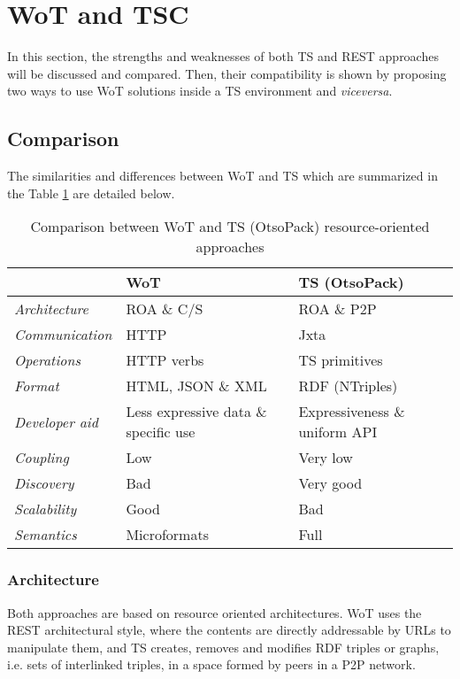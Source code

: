 \section{WoT and TSC}
\label{sec:wot_tsc_comparison}


In this section, the strengths and weaknesses of both TS and REST approaches will be discussed and compared.
Then, their compatibility is shown by proposing two ways to use WoT solutions inside a TS environment and \textit{viceversa}.

\subsection{Comparison} %
The similarities and differences between WoT and TS which are summarized in the Table \ref{tab:comparison} are detailed below.

\begin{table}[ht!]
\centering
\caption {Comparison between WoT and TS (OtsoPack) resource-oriented approaches}
\begin{tabular}{|l|p{}|p{}|}
\hline
& WoT & TS (OtsoPack) \\
\hline
\textit{Architecture} & ROA \& C/S & ROA \& P2P \\
\textit{Communication} & HTTP & Jxta \\
\textit{Operations} & HTTP verbs & TS primitives \\
\textit{Format} & HTML, JSON \& XML & RDF (NTriples) \\ %
\textit{Developer aid} & Less expressive data \& specific use & Expressiveness \& uniform API \\
\textit{Coupling} & Low & Very low \\ %
\textit{Discovery} & Bad & Very good \\
\textit{Scalability} & Good & Bad \\
\textit{Semantics} & Microformats & Full \\
\hline
\end{tabular}
\label{tab:comparison}
\end{table}

\subsubsection{Architecture}
Both approaches are based on resource oriented architectures. WoT uses the REST architectural style, where the contents are directly addressable by
URLs to manipulate them, and TS creates, removes and modifies RDF triples or graphs, i.e. sets of interlinked triples, in a space formed by peers
in a P2P network.

